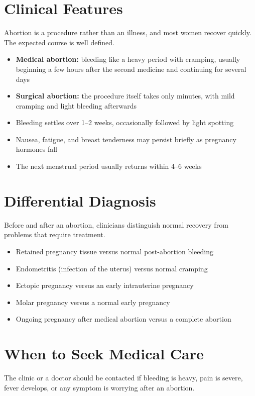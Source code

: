 \section*{Clinical Features}
Abortion is a procedure rather than an illness, and most women recover quickly. The expected course is well defined.

\begin{itemize}
    \item \textbf{Medical abortion:} bleeding like a heavy period with cramping, usually beginning a few hours after the second medicine and continuing for several days
    \item \textbf{Surgical abortion:} the procedure itself takes only minutes, with mild cramping and light bleeding afterwards
    \item Bleeding settles over 1--2 weeks, occasionally followed by light spotting
    \item Nausea, fatigue, and breast tenderness may persist briefly as pregnancy hormones fall
    \item The next menstrual period usually returns within 4--6 weeks
\end{itemize}

\section*{Differential Diagnosis}
Before and after an abortion, clinicians distinguish normal recovery from problems that require treatment.

\begin{itemize}
    \item Retained pregnancy tissue versus normal post-abortion bleeding
    \item Endometritis (infection of the uterus) versus normal cramping
    \item Ectopic pregnancy versus an early intrauterine pregnancy
    \item Molar pregnancy versus a normal early pregnancy
    \item Ongoing pregnancy after medical abortion versus a complete abortion
\end{itemize}

\section*{When to Seek Medical Care}
The clinic or a doctor should be contacted if bleeding is heavy, pain is severe, fever develops, or any symptom is worrying after an abortion.

